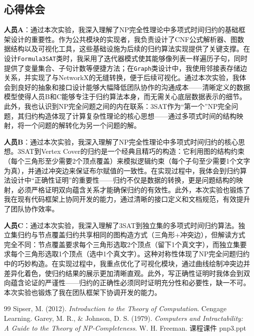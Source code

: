 \documentclass{sysucseexp}
\begin{document}
\subsection{心得体会}

\textbf{人员A}：通过本次实验，我深入理解了NP完全性理论中多项式时间归约的基础框架设计的重要性。作为公共模块的实现者，我负责设计了CNF公式解析器、图数据结构以及可视化工具，这些基础设施为后续的归约算法实现提供了关键支撑。在设计\texttt{Formula3SAT}类时，我采用了迭代器模式使其能够像列表一样遍历子句，同时提供了变量集合、子句计数等便捷方法；在\texttt{Graph}类设计中，我使用邻接表存储边关系，并实现了与NetworkX的无缝转换，便于后续可视化。通过本次实验，我体会到良好的抽象和接口设计能够大幅降低团队协作的沟通成本——清晰定义的数据模型使得人员B和C能够专注于归约算法本身，而无需关心底层数据表示的细节。此外，我也认识到NP完全问题之间的内在联系：3SAT作为``第一个''NP完全问题，其归约构造体现了计算复杂性理论的核心思想——通过多项式时间的结构映射，将一个问题的解转化为另一个问题的解。

\textbf{人员B}：通过本次实验，我深入理解了NP完全性理论中多项式时间归约的核心思想。3SAT到Vertex Cover的归约是一个经典且精巧的构造：它利用图的结构约束（每个三角形至少需要2个顶点覆盖）来模拟逻辑约束（每个子句至少需要1个文字为真），并通过冲突边来保证布尔赋值的一致性。在实现过程中，我体会到归约算法设计中``正确性证明''的重要性——归约不仅是数据的转换，更是问题结构的映射，必须严格证明双向蕴含关系才能确保归约的有效性。此外，本次实验也锻炼了我在现有代码框架上协同开发的能力，通过清晰的接口定义和文档规范，有效提升了团队协作效率。

\textbf{人员C}：通过本次实验，我深入理解了3SAT到独立集的多项式时间归约算法。独立集归约与节点覆盖归约共享相同的图构造方式（三角形+冲突边），但解读方式完全不同：节点覆盖要求每个三角形选取2个顶点（留下1个真文字），而独立集要求每个三角形选取1个顶点（选中1个真文字）。这种对称性体现了NP完全问题归约中的巧妙构造。在实现过程中，我重点优化了可视化模块，通过曲线绘制冲突边并差异化着色，使归约结果的展示更加清晰直观。此外，写正确性证明时我体会到双向蕴含论证的严谨性——归约的正确性必须同时证明充分性和必要性，缺一不可。本次实验也锻炼了我在团队框架下协调开发的能力。


\newpage

\begin{thebibliography}{99}
    Sipser, M. (2012). \textit{Introduction to the Theory of Computation}. Cengage Learning.
    Garey, M. R., \& Johnson, D. S. (1979). \textit{Computers and Intractability: A Guide to the Theory of NP-Completeness}. W. H. Freeman.
    课程课件 pnp3.ppt
\end{thebibliography}
\end{document}
